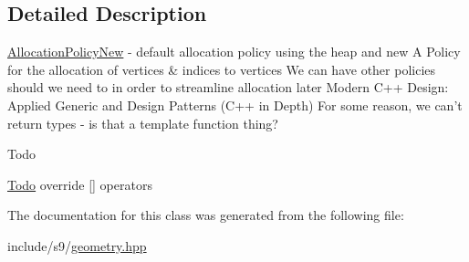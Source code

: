\subsection{Detailed Description}
\hyperlink{classs9_1_1AllocationPolicyNew}{Allocation\-Policy\-New} -\/ default allocation policy using the heap and new A Policy for the allocation of vertices \& indices to vertices We can have other policies should we need to in order to streamline allocation later Modern C++ Design\-: Applied Generic and Design Patterns (C++ in Depth) For some reason, we can't return types -\/ is that a template function thing?

\begin{DoxyRefDesc}{Todo}
\item[\hyperlink{todo__todo000018}{Todo}]override \mbox{[}\mbox{]} operators \end{DoxyRefDesc}


The documentation for this class was generated from the following file\-:\begin{DoxyCompactItemize}
\item 
include/s9/\hyperlink{geometry_8hpp}{geometry.\-hpp}\end{DoxyCompactItemize}
